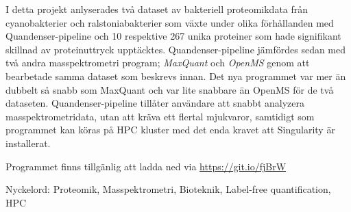 I detta projekt anlyserades två dataset av bakteriell proteomikdata från cyanobakterier och ralstoniabakterier som växte under olika förhållanden med Quandenser-pipeline och 10 respektive 267 unika proteiner som hade signifikant skillnad av proteinuttryck upptäcktes. Quandenser-pipeline jämfördes sedan med två andra masspektrometri program; \textit{MaxQuant} och \textit{OpenMS} genom att bearbetade samma dataset som beskrevs innan. Det nya programmet var mer än dubbelt så snabb som MaxQuant och var lite snabbare än OpenMS för de två dataseten. Quandenser-pipeline tillåter användare att snabbt analyzera masspektrometridata, utan att kräva ett flertal mjukvaror, samtidigt som programmet kan köras på HPC kluster med det enda kravet att Singularity är installerat.

Programmet finns tillgänlig att ladda ned via \url{https://git.io/fjBrW}

\vspace{2cm}

Nyckelord: Proteomik, Masspektrometri, Bioteknik, Label-free quantification, HPC
